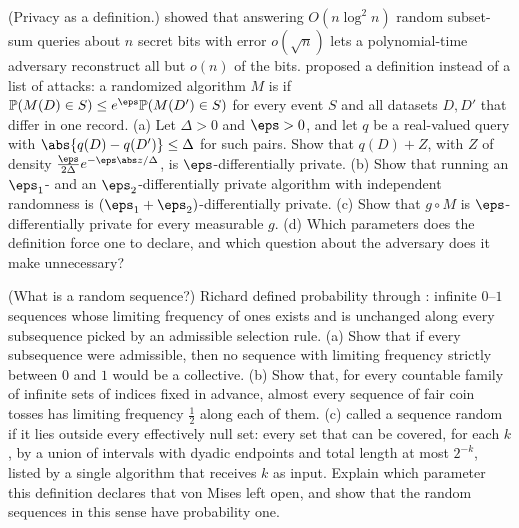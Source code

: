 \begin{refsection}
\begin{exercises}
\item\label{ex:kolmogorov:privacy} \transfer (Privacy as a definition.) \textcite{DinurNissim2003} showed that answering $O(n\log^2n)$ random subset-sum queries about $n$ secret bits with error $o(\sqrt n)$ lets a polynomial-time adversary reconstruct all but $o(n)$ of the bits. \textcite{DworkMcSherryNissimSmith2006} proposed a definition instead of a list of attacks: a randomized algorithm $M$ is  if $\kolP(M(D)\in S)\le e^\eps\kolP(M(D')\in S)$ for every event $S$ and all datasets $D,D'$ that differ in one record. (a) Let $\Delta>0$ and $\eps>0$, and let $q$ be a real-valued query with $\abs{q(D)-q(D')}\le\Delta$ for such pairs. Show that $q(D)+Z$, with $Z$ of density $\frac{\eps}{2\Delta}e^{-\eps\abs z/\Delta}$, is $\eps$-differentially private. (b) Show that running an $\eps_1$- and an $\eps_2$-differentially private algorithm with independent randomness is $(\eps_1+\eps_2)$-differentially private. (c) Show that $g\circ M$ is $\eps$-differentially private for every measurable $g$. (d) Which parameters does the definition force one to declare, and which question about the adversary does it make unnecessary? 

\item\label{ex:kolmogorov:random} \transfer (What is a random sequence?) Richard \textcite{vonMises1919} defined probability through : infinite $0$--$1$ sequences whose limiting frequency of ones exists and is unchanged along every subsequence picked by an admissible selection rule. (a) Show that if every subsequence were admissible, then no sequence with limiting frequency strictly between $0$ and $1$ would be a collective. (b) Show that, for every countable family of infinite sets of indices fixed in advance, almost every sequence of fair coin tosses has limiting frequency $\frac12$ along each of them. (c) \textcite{MartinLof1966} called a sequence random if it lies outside every effectively null set: every set that can be covered, for each $k$, by a union of intervals with dyadic endpoints and total length at most $2^{-k}$, listed by a single algorithm that receives $k$ as input. Explain which parameter this definition declares that von Mises left open, and show that the random sequences in this sense have probability one. 


\end{exercises}
\end{refsection}
